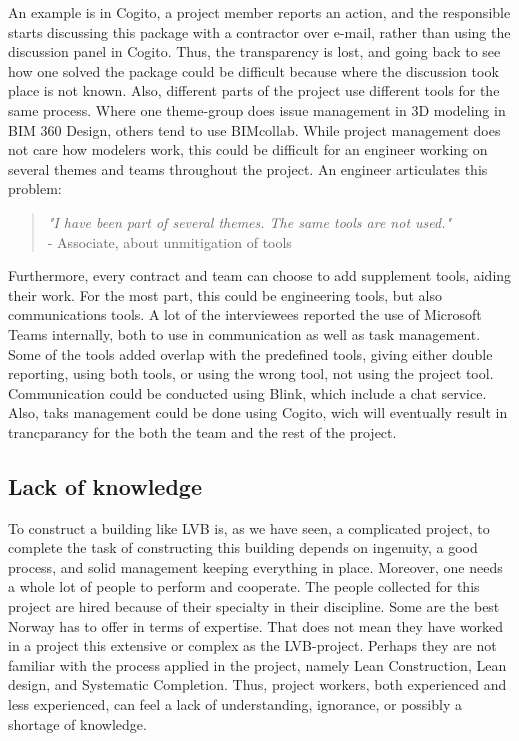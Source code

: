 An example is in Cogito, a project member reports an action, and the responsible starts discussing this package with a contractor over e-mail, rather than using the discussion panel in Cogito. Thus, the transparency is lost, and going back to see how one solved the package could be difficult because where the discussion took place is not known. Also, different parts of the project use different tools for the same process. Where one theme-group does issue management in 3D modeling in BIM 360 Design, others tend to use BIMcollab. While project management does not care how modelers work, this could be difficult for an engineer working on several themes and teams throughout the project. An engineer articulates this problem:

\begin{quote}
    \textit{"I have been part of several themes. The same tools are not used."} \\
    - Associate, about unmitigation of tools    
\end{quote}

Furthermore, every contract and team can choose to add supplement tools, aiding their work. For the most part, this could be engineering tools, but also communications tools. A lot of the interviewees reported the use of Microsoft Teams internally, both to use in communication as well as task management. Some of the tools added overlap with the predefined tools, giving either double reporting, using both tools, or using the wrong tool, not using the project tool. Communication could be conducted using Blink, which include a chat service. Also, taks management could be done using Cogito, wich will eventually result in trancparancy for the both the team and the rest of the project. 

\subsection{Lack of knowledge}
To construct a building like LVB is, as we have seen, a complicated project, to complete the task of constructing this building depends on ingenuity, a good process, and solid management keeping everything in place. Moreover, one needs a whole lot of people to perform and cooperate. The people collected for this project are hired because of their specialty in their discipline. Some are the best Norway has to offer in terms of expertise. That does not mean they have worked in a project this extensive or complex as the LVB-project. Perhaps they are not familiar with the process applied in the project, namely Lean Construction, Lean design, and Systematic Completion. Thus, project workers, both experienced and less experienced, can feel a lack of understanding, ignorance, or possibly a shortage of knowledge. 

